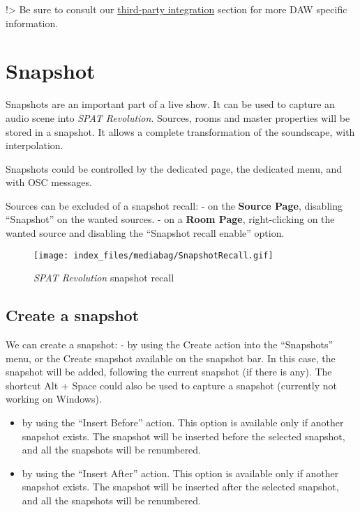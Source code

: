 \documentclass[
  letterpaper,
  DIV=11,
  numbers=noendperiod]{scrreport}
\begin{document}
!\textgreater{} Be sure to consult our
\href{Third_Party_Integration.md}{third-party integration} section for
more DAW specific information.

\hypertarget{snapshot}{%
\chapter{Snapshot}\label{snapshot}}

Snapshots are an important part of a live show. It can be used to
capture an audio scene into \emph{SPAT Revolution}. Sources, rooms and
master properties will be stored in a snapshot. It allows a complete
transformation of the soundscape, with interpolation.

Snapshots could be controlled by the dedicated page, the dedicated menu,
and with OSC messages.

Sources can be excluded of a snapshot recall: - on the \textbf{Source
Page}, disabling ``Snapshot'' on the wanted sources. - on a \textbf{Room
Page}, right-clicking on the wanted source and disabling the ``Snapshot
recall enable'' option.

\begin{figure}

{\centering \texttt{[image: index\_files/mediabag/SnapshotRecall.gif]}

}

\caption{\emph{SPAT Revolution} snapshot recall}

\end{figure}

\hypertarget{create-a-snapshot}{%
\section{Create a snapshot}\label{create-a-snapshot}}

We can create a snapshot: - by using the Create action into the
``Snapshots'' menu, or the Create snapshot available on the snapshot
bar. In this case, the snapshot will be added, following the current
snapshot (if there is any). The shortcut Alt + Space could also be used
to capture a snapshot (currently not working on Windows).

\begin{itemize}
\item
  by using the ``Insert Before'' action. This option is available only
  if another snapshot exists. The snapshot will be inserted before the
  selected snapshot, and all the snapshots will be renumbered.
\item
  by using the ``Insert After'' action. This option is available only if
  another snapshot exists. The snapshot will be inserted after the
  selected snapshot, and all the snapshots will be renumbered.
\end{itemize}
\end{document}

